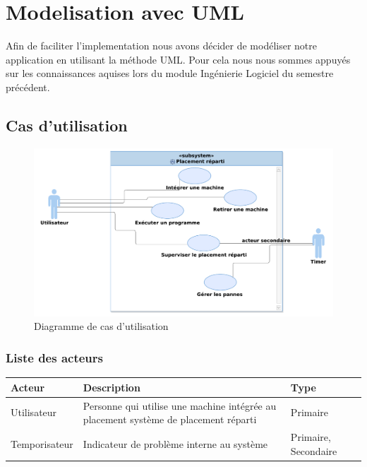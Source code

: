 \newpage
\section{Modelisation avec UML}

  Afin de faciliter l'implementation nous avons décider de modéliser
  notre application en utilisant la méthode UML. Pour cela nous nous
  sommes appuyés sur les connaissances aquises lors du module
  Ingénierie Logiciel du semestre précédent.

  \subsection{Cas d'utilisation}
  
    \begin{figure}[h!]
      \centering
      \includegraphics[width=\textwidth]{img/analyse_DiagrammeCasUtilisation.pdf}
      \caption{Diagramme de cas d'utilisation}
    \end{figure}
    
    \subsubsection{Liste des acteurs}

      \begin{tabular}{|l|p{5cm}|l|}
        \hline \bf Acteur & \bf Description & \bf Type \\ \hline
        Utilisateur & Personne qui utilise une machine intégrée au
        placement système de placement réparti & Primaire \\ \hline
        Temporisateur & Indicateur de problème interne au système & Primaire, Secondaire
        \\ \hline
      \end{tabular}
    
